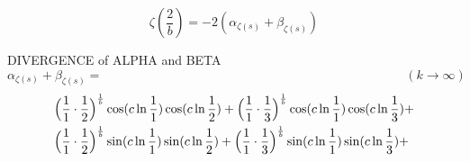 \documentclass{amsart}
\begin{document}
	\[ \zeta(\frac{2}{b}) = -2(\alpha_{\zeta(s)} + \beta_{\zeta(s)}) \]
	
	
	\newpage
	DIVERGENCE of ALPHA and BETA
	\[ \alpha_{\zeta(s)} + \beta_{\zeta(s)} = \qquad\qquad\qquad\qquad\qquad\qquad\qquad\qquad\qquad\qquad\qquad\qquad (k \to \infty) \]
	\[
	\begin{aligned}
		& \Bigl( \frac{1}{1} \cdot \frac{1}{2} \Bigr)^\frac1b \cos(c \ln \frac{1}{1}) \cos(c \ln \frac{1}{2}) + \Bigl( \frac{1}{1} \cdot \frac{1}{3} \Bigr)^\frac1b \cos(c \ln \frac{1}{1}) \cos(c \ln \frac{1}{3}) + \\
		& \Bigl( \frac{1}{1} \cdot \frac{1}{2} \Bigr)^\frac1b \sin(c \ln \frac{1}{1}) \sin(c \ln \frac{1}{2}) + \Bigl( \frac{1}{1} \cdot \frac{1}{3} \Bigr)^\frac1b \sin(c \ln \frac{1}{1}) \sin(c \ln \frac{1}{3}) + 
	\end{aligned}
	\]
	
\end{document}
